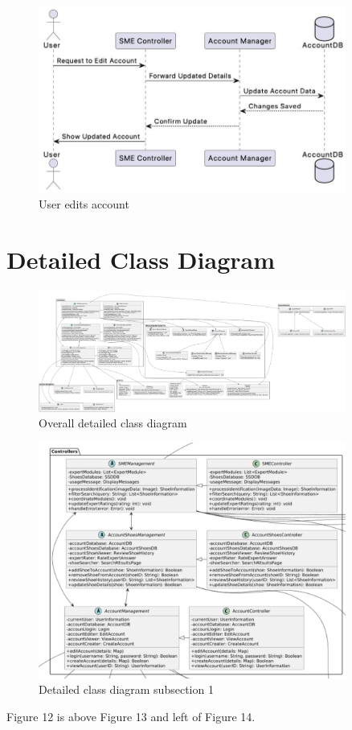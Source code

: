 \documentclass[]{article}
\begin{document}
\begin{figure}[H]
    \centering
    \includegraphics[width=0.9\textwidth]{S3/image (7).jpeg}
	\caption{User edits account}
\end{figure}




\section{Detailed Class Diagram}
\label{sec:detailed_class_diagram}
\begin{figure}[H]
    \centering
    \includegraphics[width=0.9\textwidth]{fullDiagram.png}
	\caption{Overall detailed class diagram}
\end{figure} 

\begin{figure}[H]
    \centering
    \includegraphics[width=0.9\textwidth]{figure1.png}
	\caption{Detailed class diagram subsection 1}
\end{figure}
Figure 12 is above Figure 13 and left of Figure 14.
\end{document}
